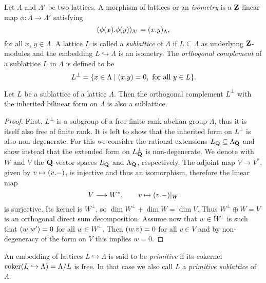 \begin{definition}
    Let $\Lambda$ and $\Lambda'$ be two lattices. A morphism of lattices or an \emph{isometry} is a $\mathbf Z$-linear map $\phi \colon \Lambda \to \Lambda'$ satisfying
    \[
        (\phi(x).\phi(y))_{\Lambda'} = (x.y)_{\Lambda},
    \]
    for all $x$, $y \in \Lambda$. A lattice $L$ is called a \emph{sublattice} of $\Lambda$ if $L \subseteq \Lambda$ as underlying $\mathbf Z$-modules and the embedding $L\hookrightarrow \Lambda$ is an isometry. The \emph{orthogonal complement} of a sublattice $L$ in $\Lambda$ is defined to be
    \[
        L^\perp = \{x \in \Lambda \mid (x.y) = 0, \text{ for all $y \in L$}\}.
    \]
\end{definition}

\begin{lemma}
    \label{orthogonal complemet is a lattice}
    Let $L$ be a sublattice of a lattice $\Lambda$. Then the orthogonal complement $L^\perp$ with the inherited bilinear form on $\Lambda$ is also a sublattice.
\end{lemma}

\begin{proof}
    First, $L^\perp$ is a subgroup of a free finite rank abelian group $\Lambda$, thus it is itself also free of finite rank. It is left to show that the inherited form on $L^\perp$ is also non-degenerate. For this we consider the rational extensions $L_\mathbf Q \subseteq \Lambda_\mathbf Q$ and show instead that the extended form on $L_\mathbf Q^\perp$ is non-degenerate. We denote with $W$ and $V$ the $\mathbf Q$-vector spaces $L_\mathbf Q$ and $\Lambda_\mathbf Q$, respectively. The adjoint map $V \to V^*$, given by $v \mapsto (v.-)$, is injective and thus an isomorphism, therefore the linear map
    \[  
        V \longrightarrow W^*, \qquad v \mapsto (v.-)|_W
    \]  
    is surjective. Its kernel is $W^\perp$, so $\dim W^\perp + \dim W = \dim V$. Thus $W^\perp \oplus W = V$ is an orthogonal direct sum decomposition. Assume now that $w \in W^\perp$ is such that $(w.w') = 0$ for all $w \in W^\perp$. Then $(w.v) = 0$ for all $v \in V$ and by non-degeneracy of the form on $V$ this implies $w = 0$.
\end{proof}

\begin{definition}
    An embedding of lattices $L \hookrightarrow \Lambda$ is said to be \emph{primitive} if its cokernel $\operatorname{coker}(L \hookrightarrow \Lambda) = \Lambda/L$ is free. In that case we also call $L$ a \emph{primitive sublattice} of $\Lambda$.
\end{definition}

